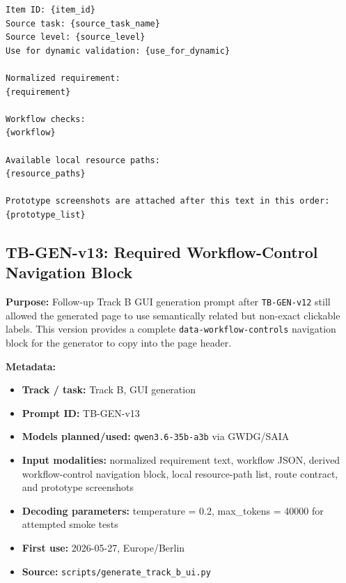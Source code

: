 \begin{verbatim}
Item ID: {item_id}
Source task: {source_task_name}
Source level: {source_level}
Use for dynamic validation: {use_for_dynamic}

Normalized requirement:
{requirement}

Workflow checks:
{workflow}

Available local resource paths:
{resource_paths}

Prototype screenshots are attached after this text in this order:
{prototype_list}
\end{verbatim}
\endgroup

\subsection{TB-GEN-v13: Required Workflow-Control Navigation Block}
\label{app:prompt-tb-gen-v13}

\textbf{Purpose:} Follow-up Track B GUI generation prompt after
\texttt{TB-GEN-v12} still allowed the generated page to use semantically
related but non-exact clickable labels. This version provides a complete
\texttt{data-workflow-controls} navigation block for the generator to copy into
the page header.

\textbf{Metadata:}
\begin{itemize}
  \item \textbf{Track / task:} Track B, GUI generation
  \item \textbf{Prompt ID:} TB-GEN-v13
  \item \textbf{Models planned/used:} \texttt{qwen3.6-35b-a3b} via GWDG/SAIA
  \item \textbf{Input modalities:} normalized requirement text, workflow JSON,
  derived workflow-control navigation block, local resource-path list, route
  contract, and prototype screenshots
  \item \textbf{Decoding parameters:} temperature = 0.2, max\_tokens = 40000
  for attempted smoke tests
  \item \textbf{First use:} 2026-05-27, Europe/Berlin
  \item \textbf{Source:} \texttt{scripts/generate\_track\_b\_ui.py}
\end{itemize}

